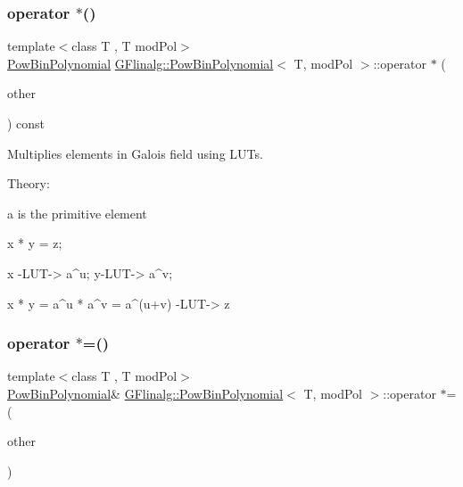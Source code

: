 \subsubsection{\texorpdfstring{operator $\ast$()}{operator *()}}
{\footnotesize\ttfamily template$<$class T , T mod\+Pol$>$ \\
\mbox{\hyperlink{class_g_flinalg_1_1_pow_bin_polynomial}{Pow\+Bin\+Polynomial}} \mbox{\hyperlink{class_g_flinalg_1_1_pow_bin_polynomial}{G\+Flinalg\+::\+Pow\+Bin\+Polynomial}}$<$ T, mod\+Pol $>$\+::operator $\ast$ (\begin{DoxyParamCaption}\item[{const \mbox{\hyperlink{class_g_flinalg_1_1_pow_bin_polynomial}{Pow\+Bin\+Polynomial}}$<$ T, mod\+Pol $>$ \&}]{other }\end{DoxyParamCaption}) const\hspace{0.3cm}{\ttfamily [inline]}}



Multiplies elements in Galois field using L\+U\+Ts. 

Theory\+: \begin{DoxyVerb}a is the primitive element

x * y = z;

x -LUT-> a^u; y-LUT-> a^v;

x * y = a^u * a^v = a^(u+v) -LUT-> z
\end{DoxyVerb}
 \mbox{\label{class_g_flinalg_1_1_pow_bin_polynomial_ac7f6ae1774920a62fd66f07e4e971c63}} 
\subsubsection{\texorpdfstring{operator $\ast$=()}{operator *=()}}
{\footnotesize\ttfamily template$<$class T , T mod\+Pol$>$ \\
\mbox{\hyperlink{class_g_flinalg_1_1_pow_bin_polynomial}{Pow\+Bin\+Polynomial}}\& \mbox{\hyperlink{class_g_flinalg_1_1_pow_bin_polynomial}{G\+Flinalg\+::\+Pow\+Bin\+Polynomial}}$<$ T, mod\+Pol $>$\+::operator $\ast$= (\begin{DoxyParamCaption}\item[{const \mbox{\hyperlink{class_g_flinalg_1_1_pow_bin_polynomial}{Pow\+Bin\+Polynomial}}$<$ T, mod\+Pol $>$ \&}]{other }\end{DoxyParamCaption})\hspace{0.3cm}{\ttfamily [inline]}}



